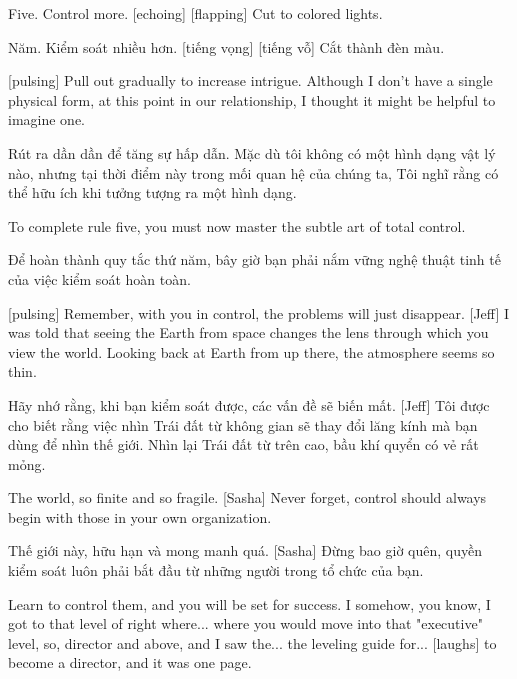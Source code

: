 \documentclass[a4paper]{article}
\begin{document}
	Five.
	Control more. [echoing]
	[flapping]
	Cut to colored lights.
	
	\begin{vietnamese-v2}
		Năm.
		Kiểm soát nhiều hơn. [tiếng vọng]
		[tiếng vỗ]
		Cắt thành đèn màu.
	\end{vietnamese-v2}
	
	[pulsing]
	Pull out gradually to increase intrigue.
	Although I don't have a single physical form, at this point in our relationship,
	I thought it might be helpful to imagine one.
	
	\begin{vietnamese-v2}
		[xung]
		Rút ra dần dần để tăng sự hấp dẫn.
		Mặc dù tôi không có một hình dạng vật lý nào, nhưng tại thời điểm này trong mối quan hệ của chúng ta,
		Tôi nghĩ rằng có thể hữu ích khi tưởng tượng ra một hình dạng.
	\end{vietnamese-v2}
	
	To complete rule five, you must now master the subtle art of total control.
	
	\begin{vietnamese-v2}
		Để hoàn thành quy tắc thứ năm, bây giờ bạn phải nắm vững nghệ thuật tinh tế của việc kiểm soát hoàn toàn.
	\end{vietnamese-v2}
	
	[pulsing]
	Remember, with you in control, the problems will just disappear.
	[Jeff] I was told that seeing the Earth from space changes the lens through which you view the world.
	Looking back at Earth from up there, the atmosphere seems so thin.
	
	\begin{vietnamese-v2}
		Hãy nhớ rằng, khi bạn kiểm soát được, các vấn đề sẽ biến mất.
		[Jeff] Tôi được cho biết rằng việc nhìn Trái đất từ không gian sẽ thay đổi lăng kính mà bạn dùng để nhìn thế giới.
		Nhìn lại Trái đất từ trên cao, bầu khí quyển có vẻ rất mỏng.
	\end{vietnamese-v2}
	
	The world, so finite and so fragile.
	[Sasha] Never forget, control should always begin with those in your own organization.
	
	\begin{vietnamese-v2}
		Thế giới này, hữu hạn và mong manh quá.
		[Sasha] Đừng bao giờ quên, quyền kiểm soát luôn phải bắt đầu từ những người trong tổ chức của bạn.
	\end{vietnamese-v2}
	
	Learn to control them, and you will be set for success.
	I somehow, you know, I got to that level of right where... where you would move into that "executive" level, so, director and above, and I saw the... the leveling guide for... [laughs] to become a director, and it was one page.
	
\end{document}
